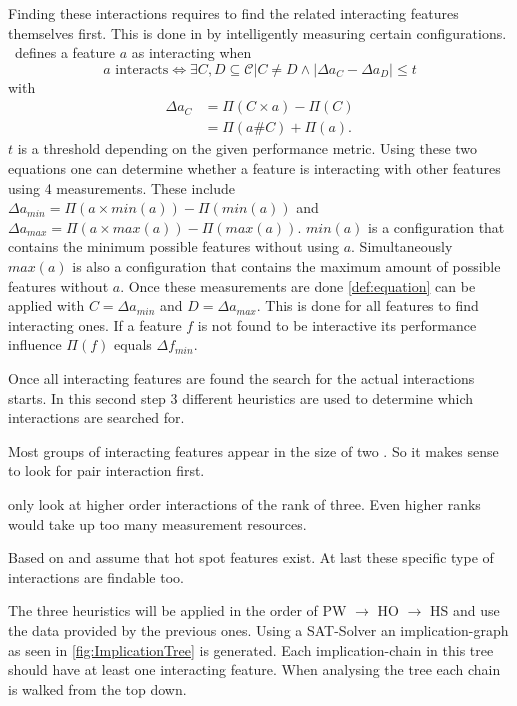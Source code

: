 Finding these interactions requires to find the related interacting features themselves first.
This is done in by intelligently measuring certain configurations. \AFID~defines a feature $a$ as interacting when
\begin{equation}\label{def:equation}
a \text{ interacts} \Leftrightarrow \exists C,D \subseteq \mathcal{C}| C \neq D  \land	 |\Delta a_C - \Delta a_D| \leq t
\end{equation}
with 
\begin{equation}
\begin{split}
\Delta a_C &= \Pi(C\times a) - \Pi(C)\\
&=\Pi(a\# C) + \Pi(a).
\end{split}
\end{equation}
$t$ is a threshold depending on the given performance metric.
Using these two equations one can determine whether a feature is interacting with other features using 4 measurements.
These include $\Delta a_{min} = \Pi(a \times min(a)) - \Pi(min(a))$ and $\Delta a_{max} = \Pi(a \times max(a)) - \Pi(max(a))$. $min(a)$ is a configuration that contains the minimum possible features without using $a$. Simultaneously $max(a)$ is also a configuration that contains the maximum amount of possible features without $a$. 
Once these measurements are done \cref{def:equation} can be applied with $C=\Delta a_{min}$ and $D=\Delta a_{max}$. This is done for all features to find interacting ones.
If a feature $f$ is not found to be interactive its performance influence $\Pi(f)$ equals $\Delta f_{min}$.

Once all interacting features are found the search for the actual interactions starts. In this second step 3 different heuristics are used to determine which interactions are searched for.
 
 \newcommand{\oitem}[2]{{\item[{\parbox[t][0pt][t]{\leftmargin}{\raggedleft #1}}] {\parbox[t]{\textwidth-\leftmargin}{#2}}}}
 \begin{itemize}[leftmargin=4cm]
 	\setlength\itemsep{1em}
 	\oitem{Pair-Wise~Heuristic (PW):\label{lab:PW}}{ Most groups of interacting features appear in the size of two \cite{AutomatedFeatureDetectionSiegmund2012,AnalysisOfTheVariabilityInFortyPreprocessor_BasedSPLLiebig}. So it makes sense to look for pair interaction first.}
 	\oitem{Higher-Order Interactions Heuristic (HO):\label{lab:HO}}{
 		\citet{AutomatedFeatureDetectionSiegmund2012} only look at higher order interactions of the rank of three. Even higher ranks would take up too many measurement resources.
 	}
 	\oitem{Hot-Spot Features Heuristic(HS):\label{lab:HS}}{
 		Based on \cite{FeatureCohesioninSPL} and \cite{CanWeAvoidHighCoupling?} \citet{AutomatedFeatureDetectionSiegmund2012} assume that hot spot features exist. At last these specific type of interactions are findable too.
 	}
 \end{itemize}
The three heuristics will be applied in the order of PW $\rightarrow$ HO $\rightarrow$ HS and use the data provided by the previous ones. Using a SAT-Solver an implication-graph as seen in \autoref{fig:ImplicationTree} is generated. Each implication-chain in this tree should have at least one interacting feature. When analysing the tree each chain is walked from the top down.   

